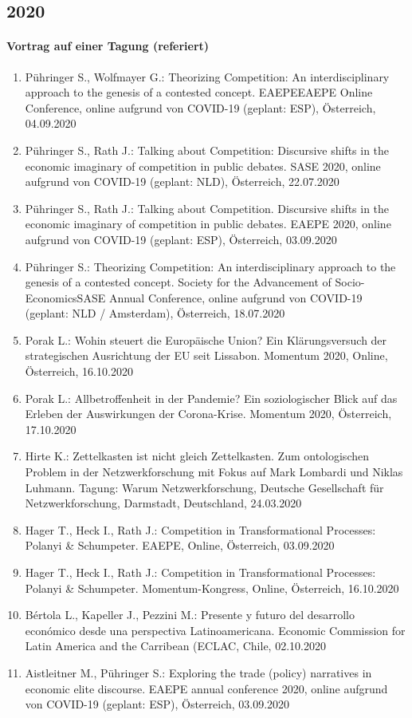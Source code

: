 \subsection*{2020}
\paragraph{Vortrag auf einer Tagung (referiert)}
\begin{enumerate}
	\item Pühringer S., Wolfmayer G.: Theorizing Competition: An interdisciplinary approach to the genesis of a contested concept. EAEPEEAEPE Online Conference, online aufgrund von COVID-19 (geplant: ESP), Österreich, 04.09.2020
	\item Pühringer S., Rath J.: Talking about Competition: Discursive shifts in the economic imaginary of competition in public debates. SASE 2020, online aufgrund von COVID-19 (geplant: NLD), Österreich, 22.07.2020
	\item Pühringer S., Rath J.: Talking about Competition. Discursive shifts in the economic imaginary of competition in public debates. EAEPE 2020, online aufgrund von COVID-19 (geplant: ESP), Österreich, 03.09.2020
	\item Pühringer S.: Theorizing Competition: An interdisciplinary approach to the genesis of a contested concept. Society for the Advancement of Socio-EconomicsSASE Annual Conference, online aufgrund von COVID-19 (geplant: NLD / Amsterdam), Österreich, 18.07.2020
	\item Porak L.: Wohin steuert die Europäische Union? Ein Klärungsversuch der strategischen Ausrichtung der EU seit Lissabon. Momentum 2020, Online, Österreich, 16.10.2020
	\item Porak L.: Allbetroffenheit in der Pandemie? Ein soziologischer Blick auf das Erleben der Auswirkungen der Corona-Krise. Momentum 2020, Österreich, 17.10.2020
	\item Hirte K.: Zettelkasten ist nicht gleich Zettelkasten. Zum ontologischen Problem in der Netzwerkforschung mit Fokus auf Mark Lombardi und Niklas Luhmann. Tagung: Warum Netzwerkforschung, Deutsche Gesellschaft für Netzwerkforschung, Darmstadt, Deutschland, 24.03.2020
	\item Hager T., Heck I., Rath J.: Competition in Transformational Processes: Polanyi \& Schumpeter. EAEPE, Online, Österreich, 03.09.2020
	\item Hager T., Heck I., Rath J.: Competition in Transformational Processes: Polanyi \& Schumpeter. Momentum-Kongress, Online, Österreich, 16.10.2020
	\item Bértola L., Kapeller J., Pezzini M.: Presente y futuro del desarrollo económico desde una perspectiva Latinoamericana. Economic Commission for Latin America and the Carribean (ECLAC, Chile, 02.10.2020
	\item Aistleitner M., Pühringer S.: Exploring the trade (policy) narratives in economic elite discourse. EAEPE annual conference 2020, online aufgrund von COVID-19 (geplant: ESP), Österreich, 03.09.2020
\end{enumerate}
